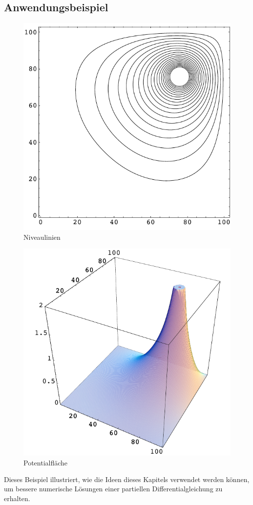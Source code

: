 \subsection{Anwendungsbeispiel}
\begin{figure}
\begin{center}
\includegraphics[width=0.8\hsize]{graphics/neilcontour}
\end{center}
\caption{Niveaulinien\label{neilcontour}}
\end{figure}
\begin{figure}
\begin{center}
\includegraphics[width=0.8\hsize]{graphics/neilloesung}
\end{center}
\caption{Potentialfläche\label{neilloesung}}
\end{figure}
Dieses Beispiel illustriert, wie die Ideen dieses Kapitels verwendet werden können,
um bessere numerische Lösungen einer partiellen Differentialgleichung
zu erhalten.

